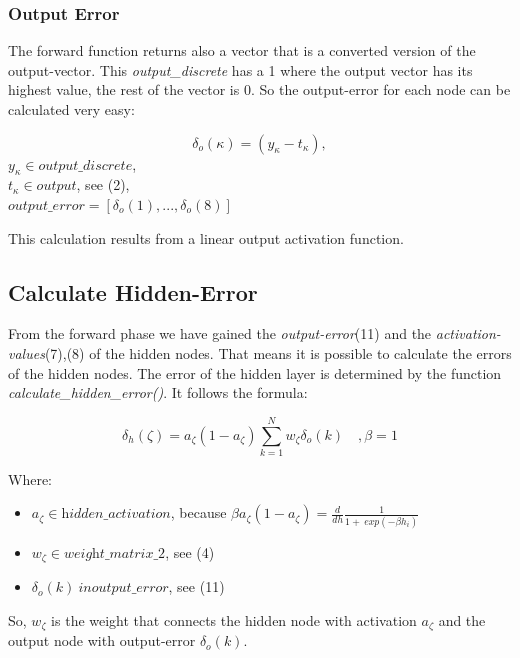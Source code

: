 \documentclass[10pt,a4paper]{article}
\begin{document}
  	\subsubsection{Output Error}
  	The forward function returns also a vector that is a converted version of the output-vector. This \textit{output\_discrete} has a 1 where the output vector has its highest value, the rest of the vector is 0. So the output-error for each node can be calculated very easy:
  	 \begin{center}
  		\begin{equation}
  		\delta_o(\kappa) = (y_{\kappa}-t_{\kappa}),
  		\end{equation}
  		$ y_{\kappa} \in \textit{output\_discrete} $, \\
  		$ t_{\kappa} \in \textit{output}$, see (2), \\
  		$ \textit{output\_error} = [\delta_o(1),...,\delta_o(8)] $
  	\end{center}
  	This calculation results from a linear output activation function.
  	\subsection{Calculate Hidden-Error}								%
	From the forward phase we have gained the \textit{output-error}(11) and the \textit{activation-values}(7),(8) of the hidden nodes. That means it is possible to calculate the errors of the hidden nodes. The error of the hidden layer is determined by the function \textit{calculate\_hidden\_error()}. It follows the formula: \\
	 \begin{center}
		\begin{equation}
		\delta_h(\zeta) = a_{\zeta}(1-a_{\zeta}) \sum_{k=1}^{N} w_{\zeta}\delta_o(k) \quad, \beta =1
		\end{equation} 
	\end{center}
	Where:
	\begin{itemize}
		\item $ a_{\zeta} \in \textit{hidden\_activation} $, because $ \beta a_{\zeta}(1-a_{\zeta}) = \frac{d}{dh} \frac{1}{1 + \ exp(-\beta h_i)}$
		\item $ w_{\zeta} \in \textit{weight\_matrix\_2}$, see (4)
		\item $ \delta_o(k) \ in \textit{output\_error} $, see (11)
	\end{itemize}
	So, $w_{\zeta}$ is the weight that connects the hidden node with activation $a_{\zeta}$ and the output node with output-error $\delta_o(k)$.
\end{document}
